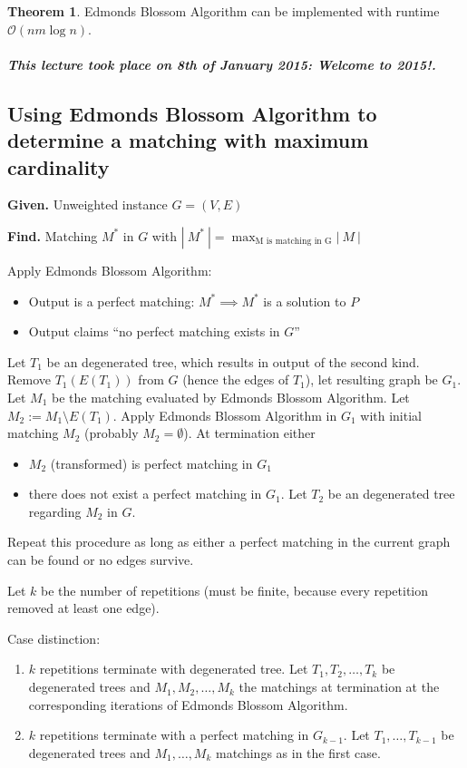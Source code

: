 \documentclass[a4paper]{article}
\theoremstyle{definition}
\newtheorem{theorem}{Theorem}
\newcommand{\card}[1]{\left|\:\!#1\:\!\right|}
\newcommand{\given}[1]{\textbf{Given.} #1\par}
\newcommand{\find}[1]{\textbf{Find.} #1\par}
\newcommand{\dateref}[1]{\paragraph{\textit{This lecture took place on #1.}}}
\begin{document}
\begin{theorem}\label{satz-6.11}
  Edmonds Blossom Algorithm can be implemented with runtime $\mathcal{O}(nm\log{n})$.
\end{theorem}

\dateref{8th of January 2015: Welcome to 2015!}

\subsection{Using Edmonds Blossom Algorithm to determine a matching with maximum cardinality}

\given{Unweighted instance $G = (V, E)$}
\find{Matching $M^*$ in $G$ with $\card{M^*} = \max_{\text{M is matching in G}}{\card{M}}$}

Apply Edmonds Blossom Algorithm:
\begin{itemize}
  \item Output is a perfect matching: $M^* \implies M^*$ is a solution to $P$
  \item Output claims ``no perfect matching exists in $G$''
\end{itemize}

Let $T_1$ be an degenerated tree, which results in output of the second kind.
Remove $T_1(E(T_1))$ from $G$ (hence the edges of $T_1$), let resulting graph be $G_1$.
Let $M_1$ be the matching evaluated by Edmonds Blossom Algorithm.
Let $M_2 := M_1 \setminus E(T_1)$.
Apply Edmonds Blossom Algorithm in $G_1$ with initial matching $M_2$ (probably $M_2 = \emptyset$).
At termination either
\begin{itemize}
  \item $M_2$ (transformed) is perfect matching in $G_1$
  \item there does not exist a perfect matching in $G_1$.
    Let $T_2$ be an degenerated tree regarding $M_2$ in $G$.
\end{itemize}

Repeat this procedure as long as either a perfect matching in the current graph can be found or no edges survive.

Let $k$ be the number of repetitions (must be finite, because every repetition removed at least one edge).

Case distinction:
\begin{enumerate}
  \item $k$ repetitions terminate with degenerated tree.
    Let $T_1, T_2, \ldots, T_k$ be degenerated trees and $M_1, M_2, \ldots, M_k$ the matchings at termination at the corresponding iterations of Edmonds Blossom Algorithm.
  \item $k$ repetitions terminate with a perfect matching in $G_{k-1}$.
    Let $T_1, \ldots, T_{k-1}$ be degenerated trees and $M_1, \ldots, M_k$ matchings as in the first case.
\end{enumerate}
\end{document}
